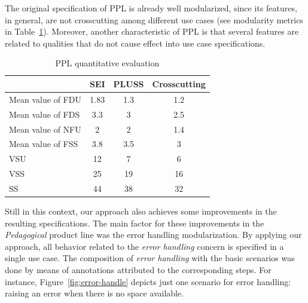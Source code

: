 \documentclass{acm_proc_article-sp}
\begin{document}
The original specification of PPL is already well modularized, since its
features, in general, are not crosscutting among different use cases (see
modularity metrics in Table~\ref{tab:ppl-metrics}). Moreover, another
characteristic of PPL is that several features are related to qualities that do
not cause effect into use case specifications.

\begin{table}[hb]
\centering
\caption{PPL quantitative evaluation}
\label{tab:ppl-metrics}
\begin{small}
\begin{tabular}{lccc} \hline
					& SEI 	& PLUSS 	& Crosscutting	\\ \hline
Mean value of FDU 		& 1.83	& 1.3	& 1.2	\\
Mean value of FDS 		& 3.3	& 3		& 2.5	\\
Mean value of NFU 		& 2		& 2		& 1.4	\\
Mean value of FSS 		& 3.8	& 3.5	& 3		\\ 
VSU 					& 12		& 7		& 6		\\
VSS 					& 25		& 19		& 16		\\
SS 					& 44		& 38		& 32		\\	\hline
\end{tabular}
\end{small}
\end{table}

Still in this context, our approach also achieves some improvements in the
resulting specifications. The main factor for these improvements in the
\emph{Pedagogical} product line was the error handling modularization. By
applying our approach, all behavior related to the \emph{error handling} concern
is specified in a single use case. The composition of \emph{error handling} with
the basic scenarios was done by means of annotations attributed to the
corresponding steps. For instance, Figure~\ref{fig:error-handle} depicts just one
scenario for error handling: raising  an error when there is no space available.

    
\end{document}
